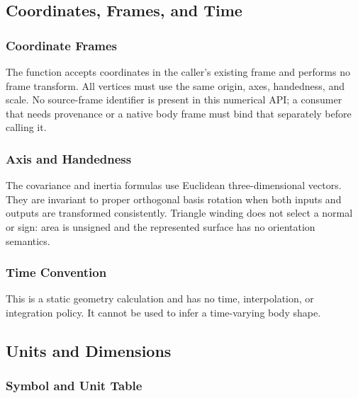 \documentclass[
  american,
]{article}
\begin{document}
\subsection{Coordinates, Frames, and
Time}\label{coordinates-frames-and-time-1}

\subsubsection{Coordinate Frames}\label{coordinate-frames-1}

The function accepts coordinates in the caller's existing frame and
performs no frame transform. All vertices must use the same origin,
axes, handedness, and scale. No source-frame identifier is present in
this numerical API; a consumer that needs provenance or a native body
frame must bind that separately before calling it.

\subsubsection{Axis and Handedness}\label{axis-and-handedness-1}

The covariance and inertia formulas use Euclidean three-dimensional
vectors. They are invariant to proper orthogonal basis rotation when
both inputs and outputs are transformed consistently. Triangle winding
does not select a normal or sign: area is unsigned and the represented
surface has no orientation semantics.

\subsubsection{Time Convention}\label{time-convention-1}

This is a static geometry calculation and has no time, interpolation, or
integration policy. It cannot be used to infer a time-varying body
shape.

\subsection{Units and Dimensions}\label{units-and-dimensions-1}

\subsubsection{Symbol and Unit Table}\label{symbol-and-unit-table-1}
\end{document}
